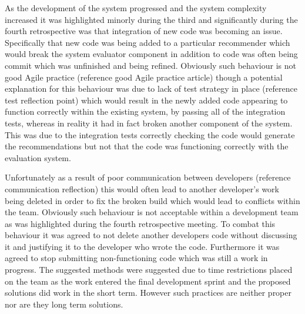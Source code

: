 \documentclass{l3proj}
\begin{document}
As the development of the system progressed and the system complexity increased it was highlighted minorly during the third and significantly during the fourth retrospective was that integration of new code was becoming an issue. Specifically that new code was being added to a particular recommender which would break the system evaluator component in addition to code was often being commit which was unfinished and being refined. Obviously such behaviour is not good Agile practice (reference good Agile practice article) though a potential explanation for this behaviour was due to lack of test strategy in place (reference test reflection point) which would result in the newly added code appearing to function correctly within the existing system, by passing all of the integration tests, whereas in reality it had in fact broken another component of the system. This was due to the integration tests correctly checking the code would generate the recommendations but not that the code was functioning correctly with the evaluation system.

Unfortunately as a result of poor communication between developers (reference communication reflection) this would often lead to another developer's work being deleted in order to fix the broken build which would lead to conflicts within the team. Obviously such behaviour is not acceptable within a development team as was highlighted during the fourth retrospective meeting. To combat this behaviour it was agreed to not delete another developers code without discussing it and justifying it to the developer who wrote the code. Furthermore it was agreed to stop submitting non-functioning code which was still a work in progress. The suggested methods were suggested due to time restrictions placed on the team as the work entered the final development sprint and the proposed solutions did work in the short term. However such practices are neither proper nor are they long term solutions. 
\end{document}
